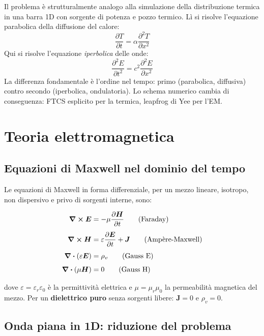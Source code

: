 \documentclass[a4paper, 11pt]{article}
\newcommand{\eps}{\varepsilon}
\newcommand{\muu}{\mu}
\begin{document}
\begin{analogia}
Il problema è strutturalmente analogo alla simulazione della distribuzione
termica in una barra 1D con sorgente di potenza e pozzo termico. Lì si risolve
l'equazione parabolica della diffusione del calore:
\[
    \frac{\partial T}{\partial t} = \alpha \frac{\partial^2 T}{\partial x^2}
\]
Qui si risolve l'equazione \emph{iperbolica} delle onde:
\[
    \frac{\partial^2 E}{\partial t^2} = c^2 \frac{\partial^2 E}{\partial x^2}
\]
La differenza fondamentale è l'ordine nel tempo: primo (parabolica, diffusiva)
contro secondo (iperbolica, ondulatoria). Lo schema numerico cambia di
conseguenza: FTCS esplicito per la termica, leapfrog di Yee per l'EM.
\end{analogia}

\section{Teoria elettromagnetica}

\subsection{Equazioni di Maxwell nel dominio del tempo}

Le equazioni di Maxwell in forma differenziale, per un mezzo lineare, isotropo,
non dispersivo e privo di sorgenti interne, sono:

\begin{align}
    \curl \bm{E} &= -\muu \frac{\partial \bm{H}}{\partial t}
        \label{eq:faraday} \tag{Faraday}\\[4pt]
    \curl \bm{H} &= \eps  \frac{\partial \bm{E}}{\partial t} + \bm{J}
        \label{eq:ampere}  \tag{Ampère-Maxwell}\\[4pt]
    \div(\eps \bm{E}) &= \rho_v \label{eq:gauss_e} \tag{Gauss E}\\[4pt]
    \div(\muu \bm{H}) &= 0      \label{eq:gauss_h} \tag{Gauss H}
\end{align}

dove $\eps = \eps_r \eps_0$ è la permittività elettrica e
$\muu = \muu_r \muu_0$ la permeabilità magnetica del mezzo.
Per un \textbf{dielettrico puro} senza sorgenti libere: $\bm{J} = 0$ e $\rho_v = 0$.

\subsection{Onda piana in 1D: riduzione del problema}
\end{document}
